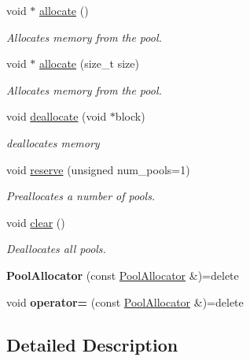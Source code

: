 \begin{DoxyCompactItemize}
\item 
void $\ast$ \hyperlink{classPoolAllocator_a31d9b799f4be0fa8003a434e9ed527f6}{allocate} ()
\begin{DoxyCompactList}\small\item\em Allocates memory from the pool. \end{DoxyCompactList}\item 
void $\ast$ \hyperlink{classPoolAllocator_a3d475d39dd7a79a53e41410743cba412}{allocate} (size\+\_\+t size)
\begin{DoxyCompactList}\small\item\em Allocates memory from the pool. \end{DoxyCompactList}\item 
void \hyperlink{classPoolAllocator_afe0fc8f55ddb9fef964018ef501924d9}{deallocate} (void $\ast$block)
\begin{DoxyCompactList}\small\item\em deallocates memory \end{DoxyCompactList}\item 
void \hyperlink{classPoolAllocator_aa87503936369b4dc59898e05b02403fb}{reserve} (unsigned num\+\_\+pools=1)
\begin{DoxyCompactList}\small\item\em Preallocates a number of pools. \end{DoxyCompactList}\item 
void \hyperlink{classPoolAllocator_a96e7694a33d088693599f83e5c06b828}{clear} ()
\begin{DoxyCompactList}\small\item\em Deallocates all pools. \end{DoxyCompactList}\item 
\hypertarget{classPoolAllocator_a64a88aa973ad9be1b4f30101dc15b720}{}{\bfseries Pool\+Allocator} (const \hyperlink{classPoolAllocator}{Pool\+Allocator} \&)=delete\label{classPoolAllocator_a64a88aa973ad9be1b4f30101dc15b720}

\item 
\hypertarget{classPoolAllocator_a8e92d9702cdfcc5ede9e024e7a66e531}{}void {\bfseries operator=} (const \hyperlink{classPoolAllocator}{Pool\+Allocator} \&)=delete\label{classPoolAllocator_a8e92d9702cdfcc5ede9e024e7a66e531}

\end{DoxyCompactItemize}


\subsection{Detailed Description}
